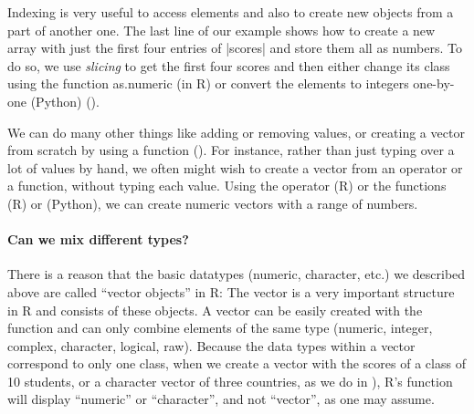 Indexing is very useful to access elements and also to
create new objects from a part of another one. The last line of our
example shows how to create a new array with just the first four
entries of |scores| and store them all as numbers. To do so, we
use \emph{slicing} to get the first four scores and then either change its class using the function
as.numeric (in R) or convert the elements to integers one-by-one (Python)  ().



We can do many other things like adding or removing values, or creating a vector from scratch by using a
function (). For instance, rather than just typing over a lot of values by hand, we often might
wish to create a vector from an operator or a function, without typing
each value. Using the operator \fn{:} (R) or the functions  (R) or  (Python), we can create numeric vectors with
a range of numbers.%



\paragraph{Can we mix different types?}
There is a reason that the basic datatypes (numeric, character, etc.) we described above are called
``vector objects'' in R: The vector is a very important structure in
R and consists of these objects. A vector can be easily created with the
 function and can only combine elements of the same type (numeric, integer, complex,
character, logical, raw).
Because the data types within a vector correspond to only one class,
when we create a vector with the scores of a class of 10 students, or a character vector of
three countries, as we do in ), R's  function will display
``numeric'' or ``character'', and not ``vector'', as one may assume.

